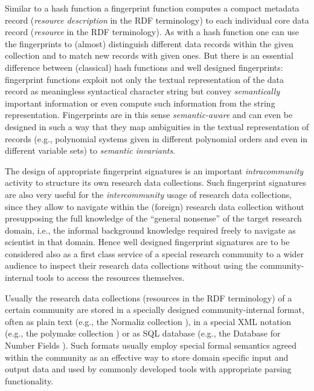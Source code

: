 \documentclass{mathincs}
\begin{document}
Similar to a hash function a fingerprint function computes a compact metadata
record (\emph{resource description} in the RDF terminology) to each individual
core data record (\emph{resource} in the RDF terminology).  As with a hash
function one can use the fingerprints to (almost) distinguish different data
records within the given collection and to match new records with given
ones. But there is an essential difference between (classical) hash functions
and well designed fingerprints: fingerprint functions exploit not only the
textual representation of the data record as meaningless syntactical character
string but convey \emph{semantically} important information or even compute
such information from the string representation.  Fingerprints are in this
sense \emph{semantic-aware} and can even be designed in such a way that they
map ambiguities in the textual representation of records (e.g., polynomial
systems given in different polynomial orders and even in different variable
sets) to \emph{semantic invariants}.

The design of appropriate fingerprint signatures is an important
\emph{intracommunity} activity to structure its own research data collections.
Such fingerprint signatures are also very useful for the \emph{intercommunity}
usage of research data collections, since they allow to navigate within the
(foreign) research data collection without presupposing the full knowledge of
the ``general nonsense'' of the target research domain, i.e., the informal
background knowledge required freely to navigate as scientist in that domain.
Hence well designed fingerprint signatures are to be considered also as a first
class service of a special research community to a wider audience to inspect
their research data collections without using the community-internal tools to
access the resources themselves.

Usually the research data collections (resources in the RDF terminology) of a
certain community are stored in a specially designed community-internal format,
often as plain text (e.g., the Normaliz collection \cite{normaliz}), in a
special XML notation (e.g., the polymake collection \cite{polymake}) or as SQL
database (e.g., the Database for Number Fields \cite{MalleKlueners}).  Such
formats usually employ special formal semantics agreed within the community as
an effective way to store domain specific input and output data and used by
commonly developed tools with appropriate parsing functionality.
\end{document}

